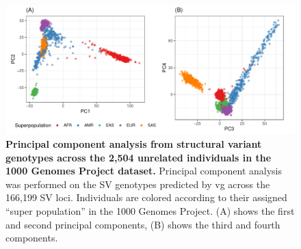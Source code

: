 \documentclass[11pt]{ucscthesis}
\begin{document}
\begin{figure}[htp]
  \includegraphics[width=\linewidth]{fig-sv-1kgp-pcs.pdf}
  \caption[PCA of SV genotypes in the 1000 Genomes Project]{{\bf Principal component analysis from structural variant genotypes across the 2,504 unrelated individuals in the 1000 Genomes Project dataset. }
    Principal component analysis was performed on the SV genotypes predicted by vg across the 166,199 SV loci.
    Individuals are colored according to their assigned ``super population'' in the 1000 Genomes Project.
    (A) shows the first and second principal components, (B) shows the third and fourth components.
  }
  \label{fig:1kgp-sv-pcs}
\end{figure}
\end{document}
